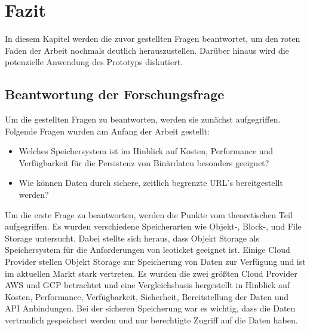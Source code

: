 \chapter{Fazit}

In diesem Kapitel werden die zuvor gestellten Fragen beantwortet, um den roten Faden der Arbeit nochmals deutlich herauszustellen. Darüber hinaus wird die potenzielle Anwendung des Prototyps diskutiert.

\section{Beantwortung der Forschungsfrage}

Um die gestellten Fragen zu beantworten, werden sie zunächst aufgegriffen. Folgende Fragen wurden am Anfang der Arbeit gestellt:

\begin{itemize}
	\item Welches Speichersystem ist im Hinblick auf Kosten, Performance und Verfügbarkeit für die Persistenz von Binärdaten besonders geeignet? 
	\item Wie können Daten durch sichere, zeitlich begrenzte URL's bereitgestellt werden?
\end{itemize}

Um die erste Frage zu beantworten, werden die Punkte vom theoretischen Teil aufgegriffen. Es wurden verschiedene Speicherarten wie Objekt-, Block-, und File Storage untersucht. Dabei stellte sich heraus, dass Objekt Storage als Speichersystem für die Anforderungen von leoticket geeignet ist. Einige Cloud Provider stellen Objekt Storage zur Speicherung von Daten zur Verfügung und ist im aktuellen Markt stark vertreten. Es wurden die zwei größten Cloud Provider AWS und GCP betrachtet und eine Vergleichsbasis hergestellt in Hinblick auf Kosten, Performance, Verfügbarkeit, Sicherheit, Bereitstellung der Daten und API Anbindungen. Bei der sicheren Speicherung war es wichtig, dass die Daten vertraulich gespeichert werden und nur berechtigte Zugriff auf die Daten haben.\\

